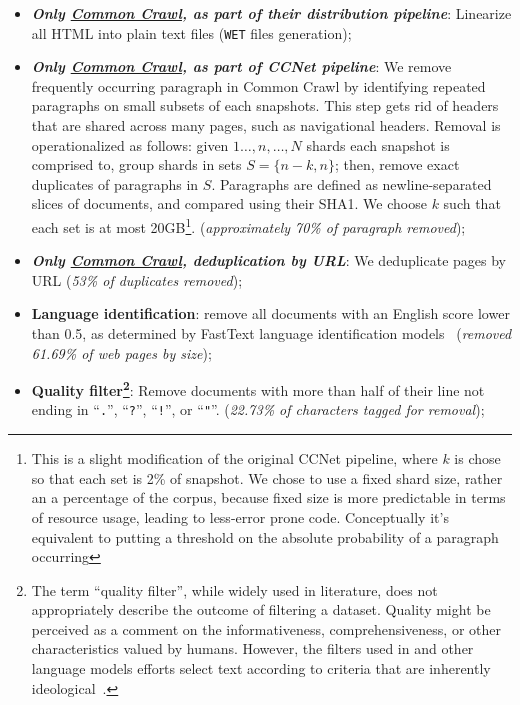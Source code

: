 \begin{itemize}[leftmargin=1em]
    \item \textbf{\textit{Only \underline{Common Crawl}, as part of their distribution pipeline}}: Linearize all HTML into plain text files (\texttt{WET} files generation);
    \item \textbf{\textit{Only \underline{Common Crawl}, as part of CCNet pipeline}}: We remove frequently occurring paragraph in Common Crawl by identifying repeated paragraphs on small subsets of each snapshots. This step gets rid of headers that are shared across many pages, such as navigational headers. 
    Removal is operationalized as follows: given $1\ldots,n,\ldots,N$ shards each snapshot is comprised to, group shards in sets $S=\{n-k, n\}$; then, remove exact duplicates of paragraphs in $S$. Paragraphs are defined as newline-separated slices of documents, and compared using their SHA1. We choose $k$ such that each set is at most 20GB\footnote{This is a slight modification of the original CCNet pipeline, where $k$ is chose so that each set is 2\% of snapshot. We chose to use a fixed shard size, rather an a percentage of the corpus, because fixed size is more predictable in terms of resource usage, leading to less-error prone code. Conceptually it’s equivalent to putting a threshold on the absolute probability of a paragraph occurring}. (\textit{approximately 70\% of paragraph removed});
    \item \textbf{\textit{Only \underline{Common Crawl}, deduplication by URL}}: We deduplicate pages by URL (\textit{53\% of duplicates removed});
    \item \textbf{Language identification}: remove all documents with an English score lower than 0.5, as determined by FastText language identification models~\citep{joulin2016fasttext,joulin2016bag} (\textit{removed 61.69\% of web pages by size});
    \item \textbf{Quality filter\footnote{\label{foot:quality}The term ``quality filter'', while widely used in literature, does not appropriately describe the outcome of filtering a dataset. Quality might be perceived as a comment on the informativeness, comprehensiveness, or other characteristics valued by humans. However, the filters used in \dolma and other language models efforts select text according to criteria that are inherently ideological~\citep{gururangan-etal-2022-whose}.}}: Remove documents with more than half of their line not ending in ``\texttt{.}'', ``\texttt{?}'', ``\texttt{!}'', or ``\texttt{"}''. (\textit{22.73\% of characters tagged for removal});

\end{itemize}
